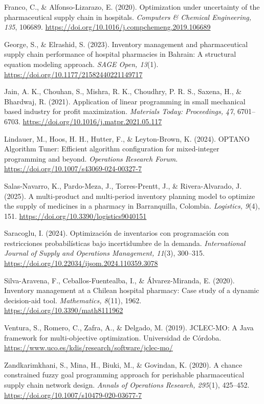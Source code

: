 \documentclass[12pt,letterpaper]{article}
\begin{document}
Franco, C., \& Alfonso-Lizarazo, E. (2020). Optimization under uncertainty of the pharmaceutical supply chain in hospitals. \textit{Computers \& Chemical Engineering, 135}, 106689. \url{https://doi.org/10.1016/j.compchemeng.2019.106689}

George, S., \& Elrashid, S. (2023). Inventory management and pharmaceutical supply chain performance of hospital pharmacies in Bahrain: A structural equation modeling approach. \textit{SAGE Open, 13}(1). \url{https://doi.org/10.1177/21582440221149717}

Jain, A. K., Chouhan, S., Mishra, R. K., Choudhry, P. R. S., Saxena, H., \& Bhardwaj, R. (2021). Application of linear programming in small mechanical based industry for profit maximization. \textit{Materials Today: Proceedings, 47}, 6701--6703. \url{https://doi.org/10.1016/j.matpr.2021.05.117}

Lindauer, M., Hoos, H. H., Hutter, F., \& Leyton-Brown, K. (2024). OPTANO Algorithm Tuner: Efficient algorithm configuration for mixed-integer programming and beyond. \textit{Operations Research Forum}. \url{https://doi.org/10.1007/s43069-024-00327-7}

Salas-Navarro, K., Pardo-Meza, J., Torres-Prentt, J., \& Rivera-Alvarado, J. (2025). A multi-product and multi-period inventory planning model to optimize the supply of medicines in a pharmacy in Barranquilla, Colombia. \textit{Logistics, 9}(4), 151. \url{https://doi.org/10.3390/logistics9040151}

Saracoglu, I. (2024). Optimización de inventarios con programación con restricciones probabilísticas bajo incertidumbre de la demanda. \textit{International Journal of Supply and Operations Management, 11}(3), 300--315. \url{https://doi.org/10.22034/ijsom.2024.110359.3078}

Silva-Aravena, F., Ceballos-Fuentealba, I., \& Álvarez-Miranda, E. (2020). Inventory management at a Chilean hospital pharmacy: Case study of a dynamic decision-aid tool. \textit{Mathematics, 8}(11), 1962. \url{https://doi.org/10.3390/math8111962}

Ventura, S., Romero, C., Zafra, A., \& Delgado, M. (2019). JCLEC-MO: A Java framework for multi-objective optimization. Universidad de Córdoba. \url{https://www.uco.es/kdis/research/software/jclec-mo/}

Zandkarimkhani, S., Mina, H., Biuki, M., \& Govindan, K. (2020). A chance constrained fuzzy goal programming approach for perishable pharmaceutical supply chain network design. \textit{Annals of Operations Research, 295}(1), 425--452. \url{https://doi.org/10.1007/s10479-020-03677-7}
\endgroup
\end{document}
